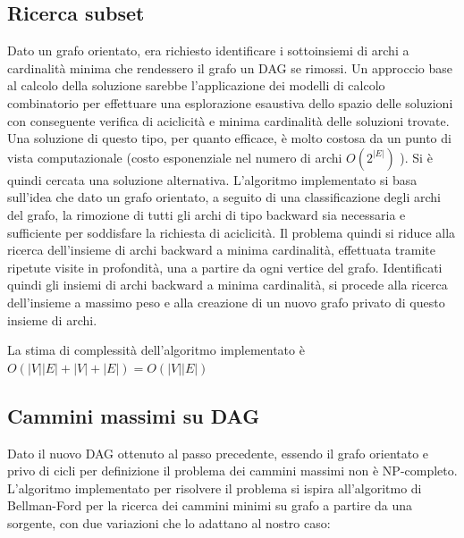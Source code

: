 \documentclass[11pt, a4paper, titlepage]{article}
\begin{document}
            \subsection{Ricerca subset}
                Dato un grafo orientato, era richiesto identificare i sottoinsiemi di archi a cardinalità minima che rendessero il grafo un DAG se rimossi.
                Un approccio base al calcolo della soluzione sarebbe l'applicazione dei modelli di calcolo combinatorio per effettuare una esplorazione esaustiva dello
                spazio delle soluzioni con conseguente verifica di aciclicità e minima cardinalità delle soluzioni trovate. Una soluzione di questo tipo, per quanto efficace,
                è molto costosa da un punto di vista computazionale (costo esponenziale nel numero di archi
                \begin{math}
                    O(2^{|E|})
                \end{math}
                ).
                Si è quindi cercata una soluzione alternativa.
                L'algoritmo implementato si basa sull'idea che dato un grafo orientato, a seguito di una classificazione degli archi del grafo, la rimozione di tutti gli archi di
                tipo backward sia necessaria e sufficiente per soddisfare la richiesta di aciclicità. Il problema quindi si riduce alla ricerca dell'insieme di archi backward a minima cardinalità,
                effettuata tramite ripetute visite in profondità, una a partire da ogni vertice del grafo. Identificati quindi gli insiemi di archi backward a minima cardinalità, si procede alla
                ricerca dell'insieme a massimo peso e alla creazione di un nuovo grafo privato di questo insieme di archi.

                La stima di complessità dell'algoritmo implementato è 
                \begin{math}
                    O(|V| |E| + |V|+|E|) = O(|V| |E|)
                \end{math}
                

            \subsection{Cammini massimi su DAG}
                Dato il nuovo DAG ottenuto al passo precedente, essendo il grafo orientato e privo di cicli per definizione il problema dei cammini massimi non è NP-completo.
                L'algoritmo implementato per risolvere il problema si ispira all'algoritmo di Bellman-Ford per la ricerca dei cammini minimi su grafo a partire da una sorgente, con due variazioni
                che lo adattano al nostro caso: 
                
\end{document}
